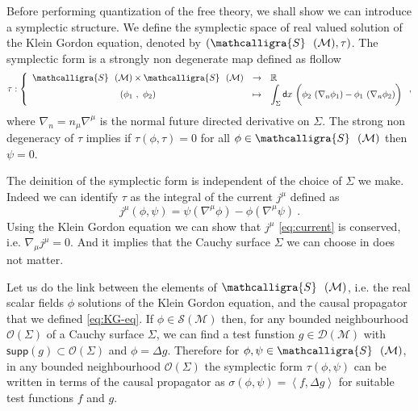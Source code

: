 \documentclass[10pt]{book}
\newcommand{\supp}{\mathsf{supp}}
\newcommand{\sm}[1]{\left\langle#1\right\rangle}
\let\int\int
\def\bigint{\displaystyle\int}
\newcommand{\Dcal}{\mathcal{D}}
\newcommand{\Mcal}{\mathcal{M}}
\newcommand{\Ocal}{\mathcal{O}}
\newcommand{\Scal}{\mathcal{S}}
\newcommand{\Rbb}{\mathbb{R}}
\newcommand{\dsf}{\mathsf{d}}
\theoremstyle{break}
\begin{document}
Before performing quantization of the free theory, we shall show we can introduce a symplectic structure. We define the symplectic space of real valued solution of the Klein Gordon equation, denoted by $(\mathcalligra{S} \ \ (\Mcal),\tau)$. The symplectic form is a strongly non degenerate map  defined as flollow
%
\begin{equation*}
\tau : \left\{
\begin{array}{ccl}
\mathcalligra{S} \ \ (\Mcal) \times \mathcalligra{S} \ \ (\Mcal) & \to & \Rbb \\
(\phi_1 \ , \ \phi_2) & \mapsto & \bigint_\Sigma  \dsf x \ \bigg( \phi_2 \ (\nabla_n \phi_1) - \phi_1 \ (\nabla_n \phi_2) \bigg)
\end{array}
\right. ,
\end{equation*}
%
where $\nabla_n = n_\mu \nabla^\mu$ is the normal future directed derivative on $\Sigma$. The strong non degeneracy of $\tau$ implies if $\tau(\phi,\tau)=0$ for all $\phi \in \mathcalligra{S} \ \ (\Mcal)$ then $\psi=0$.


\bigskip


The deinition of the symplectic form is independent of the choice of $\Sigma$ we make. Indeed we can identify $\tau$ as the integral of the current $j^\mu$ defined as
%
\begin{equation}
j^\mu (\phi,\psi) = \psi (\nabla^\mu \phi) - \phi (\nabla^\mu \psi) \ . 
\label{eq:current}
\end{equation}
%
Using the Klein Gordon equation we can show that $j^\mu$ \eqref{eq:current} is conserved, i.e. $\nabla_\mu j^\mu = 0$. And it implies that the Cauchy surface $\Sigma$ we can choose in does not matter. 


\bigskip


Let us do the link between the elements of $\mathcalligra{S} \ \ (\Mcal)$, i.e. the real scalar fields $\phi$ solutions of the Klein Gordon equation, and the causal propagator that we defined \eqref{eq:KG-eq}. If $\phi \in \Scal(\Mcal)$ then, for any bounded neighbourhood $\Ocal(\Sigma)$ of a Cauchy surface $\Sigma$, we can find a test funstion $g\in \Dcal(\Mcal)$ with $\supp\left(g\right) \subset \Ocal(\Sigma)$ and $\phi = \Delta g$. Therefore for $\phi , \psi \in \mathcalligra{S} \ \ (\Mcal)$, in any bounded neighbourhood $\Ocal(\Sigma)$ the symplectic form $\tau(\phi, \psi)$ can be written in terms of the causal propagator as $\sigma(\phi,\psi) = \sm{f , \Delta g}$ for suitable test functions $f$ and $g$. 


\end{document}
